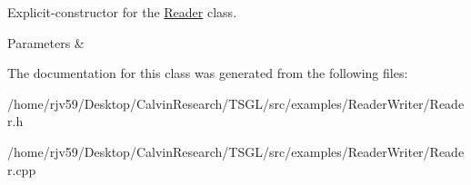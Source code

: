 Explicit-\/constructor for the \hyperlink{class_reader}{Reader} class. 


\begin{DoxyParams}{Parameters}
{\em } & \\
\hline
\end{DoxyParams}


The documentation for this class was generated from the following files\+:\begin{DoxyCompactItemize}
\item 
/home/rjv59/\+Desktop/\+Calvin\+Research/\+T\+S\+G\+L/src/examples/\+Reader\+Writer/Reader.\+h\item 
/home/rjv59/\+Desktop/\+Calvin\+Research/\+T\+S\+G\+L/src/examples/\+Reader\+Writer/Reader.\+cpp\end{DoxyCompactItemize}
